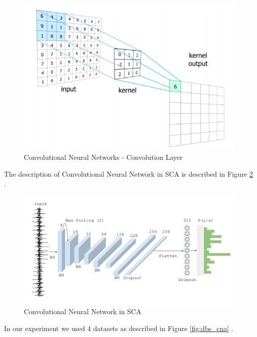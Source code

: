 \begin{figure}
    \centering
    \includegraphics[scale=0.5]{images/chapter8/CNA.PNG}
    \caption{Convolutional Neural Networks - Convolution Layer}
    \label{fig:cna}
\end{figure}

The description of Convolutional Neural Network in SCA is described in Figure \ref{fig:cna_sca} .

\begin{figure}
    \centering
    \includegraphics[scale=0.5]{images/chapter8/cnn_sca.PNG}
    \caption{Convolutional Neural Network in SCA}
    \label{fig:cna_sca}
\end{figure}

In our experiment we used 4 datasets as described in Figure \ref{fig:dbs_cna} .

